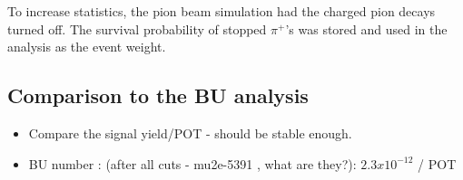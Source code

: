 To increase statistics, the pion beam simulation had the charged pion decays turned off.
The survival probability of stopped $\pi^+$'s was stored and used in the analysis
as the event weight.

\subsection{Comparison to the BU analysis}

{\red 
\begin{itemize}
\item 
  Compare the signal yield/POT  - should be stable enough.
\item
  BU number : (after all cuts - mu2e-5391 , what are they?): $2.3 x 10^{-12}$ / POT
\end{itemize}
}

